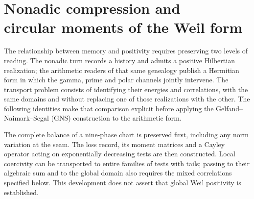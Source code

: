 \clearpage
\section[Nonadic compression and circular moments of the Weil form]{Nonadic compression and\\circular moments of the Weil form}
\label{viii:sec:transporte-momentos}
\label{viii:tm-add-seccion}

The relationship between memory and positivity requires preserving two levels of reading.
The nonadic turn records a history and admits a positive Hilbertian
realization; the arithmetic readers of that same genealogy publish a Hermitian
form in which the gamma, prime and polar channels jointly intervene.
The transport problem consists of identifying their energies and correlations,
with the same domains and without replacing one of those realizations with the other.
The following identities make that comparison explicit before applying
the Gelfand--Naimark--Segal (GNS) construction to the arithmetic form.

The complete balance of a nine-phase chart is preserved first, including
any norm variation at the seam. The loss record,
its moment matrices and a Cayley operator acting on
exponentially decreasing tests are then constructed. Local coercivity can be transported
to entire families of tests with tails; passing to their algebraic sum and to the global
domain also requires the mixed correlations specified below.
This development does not assert that global Weil positivity is established.

% 
% 
% 
% 


